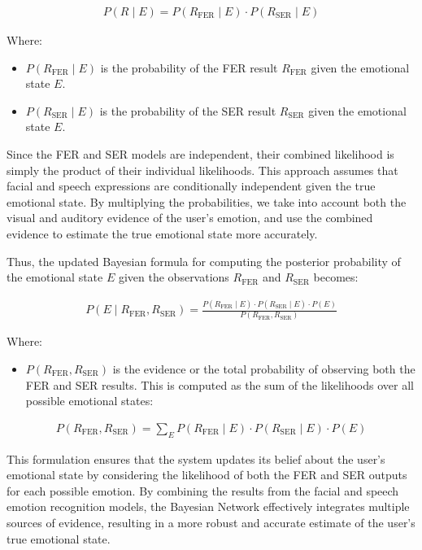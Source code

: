 \begin{gather}
    P(R \mid E) = P(R_{\text{FER}} \mid E) \cdot P(R_{\text{SER}} \mid E)
\end{gather}


Where:
\begin{itemize}
    \item \( P(R_{\text{FER}} \mid E) \) is the probability of the FER result \( R_{\text{FER}} \) given the emotional state \( E \).
    \item \( P(R_{\text{SER}} \mid E) \) is the probability of the SER result \( R_{\text{SER}} \) given the emotional state \( E \).
\end{itemize}

Since the FER and SER models are independent, their combined likelihood is simply the product of their individual likelihoods. This approach assumes that facial and speech expressions are conditionally independent given the true emotional state. By multiplying the probabilities, we take into account both the visual and auditory evidence of the user’s emotion, and use the combined evidence to estimate the true emotional state more accurately.

Thus, the updated Bayesian formula for computing the posterior probability of the emotional state \( E \) given the observations \( R_{\text{FER}} \) and \( R_{\text{SER}} \) becomes:

\begin{gather}
    P(E \mid R_{\text{FER}}, R_{\text{SER}}) = \frac{P(R_{\text{FER}} \mid E) \cdot P(R_{\text{SER}} \mid E) \cdot P(E)}{P(R_{\text{FER}}, R_{\text{SER}})}
\end{gather}

Where:
\begin{itemize}
    \item \( P(R_{\text{FER}}, R_{\text{SER}}) \) is the evidence or the total probability of observing both the FER and SER results. This is computed as the sum of the likelihoods over all possible emotional states:
\end{itemize}

\begin{gather}
    P(R_{\text{FER}}, R_{\text{SER}}) = \sum_{E} P(R_{\text{FER}} \mid E) \cdot P(R_{\text{SER}} \mid E) \cdot P(E)
\end{gather}

This formulation ensures that the system updates its belief about the user's emotional state by considering the likelihood of both the FER and SER outputs for each possible emotion. By combining the results from the facial and speech emotion recognition models, the Bayesian Network effectively integrates multiple sources of evidence, resulting in a more robust and accurate estimate of the user's true emotional state.

